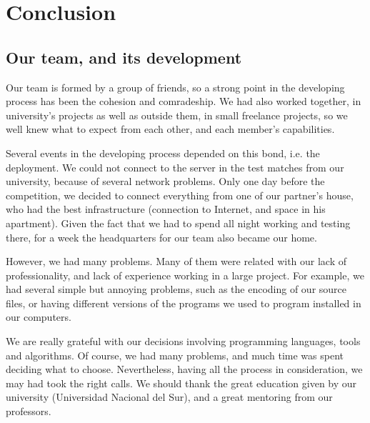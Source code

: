 \documentclass{llncs2e/llncs}
\begin{document}
\section{Conclusion}




\subsection{Our team, and its development}
    

    Our team is formed by a group of friends, so a strong point in the developing 
    process has been the cohesion and comradeship. We had also worked together,
    in university's projects as well as outside them, in small freelance 
    projects, so we well knew what to expect from each other, and each member's 
    capabilities. 

    Several events in the developing process depended on this bond, i.e. the 
    deployment. We could not connect to the server in the test matches from our 
    university, because of several network problems. Only one day before 
    the competition, we decided to connect everything from one of our partner's house, 
    who had the best infrastructure (connection to Internet, and space in his 
    apartment). Given the fact that we had to spend all night working and testing
    there, for a week the headquarters for our team also became our home.

    However, we had many problems. Many of them were related with our lack of 
    professionality, and lack of experience working in a large project. 
    For example, we had several simple but annoying problems, such as the 
    encoding of our source files, or having different versions of the programs 
    we used to program installed in our computers.

    We are really grateful with our decisions involving programming languages, 
    tools and algorithms. Of course, we had many problems, and much time was spent 
    deciding what to choose. Nevertheless, having all the process in 
    consideration, we may had took the right calls. We should thank the great 
    education given by our university (Universidad Nacional del Sur), and a 
    great mentoring from our professors.
\end{document}
